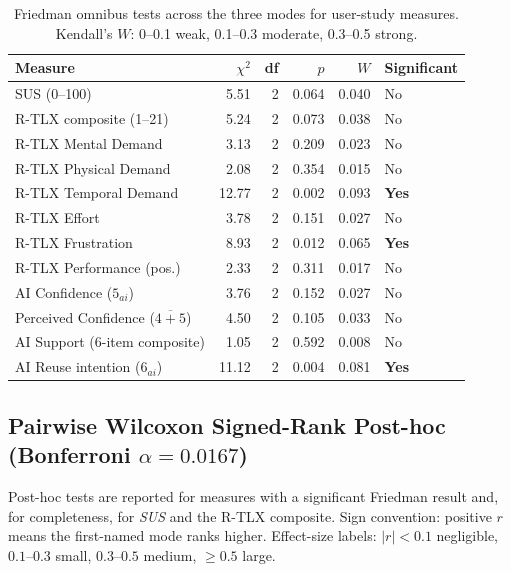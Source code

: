 \begin{table}[H]
\centering
\small
\begin{tabular}{@{}l r r r r l@{}}
\toprule
Measure & $\chi^2$ & df & $p$ & $W$ & Significant \\
\midrule
SUS (0--100)                    & 5.51  & 2 & 0.064  & 0.040 & No \\
R-TLX composite (1--21)         & 5.24  & 2 & 0.073  & 0.038 & No \\
R-TLX Mental Demand             & 3.13  & 2 & 0.209  & 0.023 & No \\
R-TLX Physical Demand           & 2.08  & 2 & 0.354  & 0.015 & No \\
R-TLX Temporal Demand           & 12.77 & 2 & 0.002  & 0.093 & \textbf{Yes} \\
R-TLX Effort                    & 3.78  & 2 & 0.151  & 0.027 & No \\
R-TLX Frustration               & 8.93  & 2 & 0.012  & 0.065 & \textbf{Yes} \\
R-TLX Performance (pos.)        & 2.33  & 2 & 0.311  & 0.017 & No \\
AI Confidence ($5_{ai}$)        & 3.76  & 2 & 0.152  & 0.027 & No \\
Perceived Confidence ($\overline{4{+}5}$) & 4.50  & 2 & 0.105  & 0.033 & No \\
AI Support (6-item composite)   & 1.05  & 2 & 0.592  & 0.008 & No \\
AI Reuse intention ($6_{ai}$)   & 11.12 & 2 & 0.004  & 0.081 & \textbf{Yes} \\
\bottomrule
\end{tabular}
\caption{Friedman omnibus tests across the three modes for user-study measures.
Kendall's $W$: 0--0.1 weak, 0.1--0.3 moderate, 0.3--0.5 strong.}
\label{tab:app-survey-friedman}
\end{table}

\subsection{Pairwise Wilcoxon Signed-Rank Post-hoc (Bonferroni $\alpha = 0.0167$)}

Post-hoc tests are reported for measures with a significant Friedman result
and, for completeness, for \textit{SUS} and the R-TLX composite. Sign convention:
positive $r$ means the first-named mode ranks higher. Effect-size labels:
$|r| < 0.1$ negligible, $0.1$--$0.3$ small, $0.3$--$0.5$ medium, $\geq 0.5$ large.

